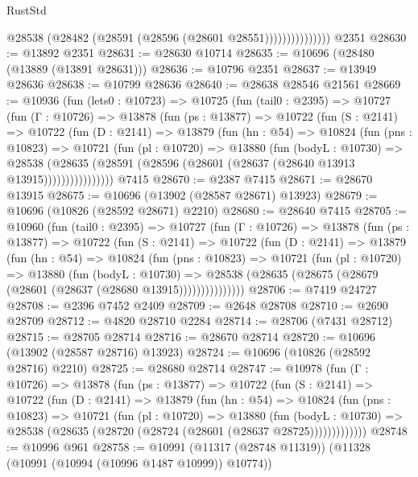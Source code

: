 \begin{lexlean}{RustStd}
\begin{coremodule}
                        @28538 (@28482 (@28591 (@28596 (@28601 @28551)))))))))))))))
    @2351
@28630 := @13892 @2351
@28631 := @28630 @10714
@28635 := @10696 (@28480 (@13889 (@13891 @28631)))
@28636 := @10796 @2351
@28637 := @13949 @28636
@28638 := @10799 @28636
@28640 := @28638 @28546 @21561
@28669 := @10936
    (fun (lets0 : @10723) =>
    @10725
      (fun (tail0 : @2395) =>
      @10727
        (fun (Γ : @10726) =>
        @13878
          (fun (ps : @13877) =>
          @10722
            (fun (S : @2141) =>
            @10722
              (fun (D : @2141) =>
              @13879
                (fun (hn : @54) =>
                @10824
                  (fun (pns : @10823) =>
                  @10721
                    (fun (pl : @10720) =>
                    @13880
                      (fun (bodyL : @10730) =>
                      @28538
                        (@28635
                          (@28591 (@28596 (@28601 (@28637 (@28640 @13913 @13915))))))))))))))))
    @7415
@28670 := @2387 @7415
@28671 := @28670 @13915
@28675 := @10696 (@13902 (@28587 @28671) @13923)
@28679 := @10696 (@10826 (@28592 @28671) @2210)
@28680 := @28640 @7415
@28705 := @10960
    (fun (tail0 : @2395) =>
    @10727
      (fun (Γ : @10726) =>
      @13878
        (fun (ps : @13877) =>
        @10722
          (fun (S : @2141) =>
          @10722
            (fun (D : @2141) =>
            @13879
              (fun (hn : @54) =>
              @10824
                (fun (pns : @10823) =>
                @10721
                  (fun (pl : @10720) =>
                  @13880
                    (fun (bodyL : @10730) =>
                    @28538 (@28635 (@28675 (@28679 (@28601 (@28637 (@28680 @13915)))))))))))))))
@28706 := @7419 @24727
@28708 := @2396 @7452 @2409
@28709 := @2648 @28708
@28710 := @2690 @28709
@28712 := @4820 @28710 @2284
@28714 := @28706 (@7431 @28712)
@28715 := @28705 @28714
@28716 := @28670 @28714
@28720 := @10696 (@13902 (@28587 @28716) @13923)
@28724 := @10696 (@10826 (@28592 @28716) @2210)
@28725 := @28680 @28714
@28747 := @10978
    (fun (Γ : @10726) =>
    @13878
      (fun (ps : @13877) =>
      @10722
        (fun (S : @2141) =>
        @10722
          (fun (D : @2141) =>
          @13879
            (fun (hn : @54) =>
            @10824
              (fun (pns : @10823) =>
              @10721
                (fun (pl : @10720) =>
                @13880
                  (fun (bodyL : @10730) =>
                  @28538 (@28635 (@28720 (@28724 (@28601 (@28637 @28725)))))))))))))
@28748 := @10996 @961
@28758 := @10991 (@11317 (@28748 @11319)) (@11328 (@10991 (@10994 (@10996 @1487 @10999)) @10774))

\end{coremodule}
\end{lexlean}
